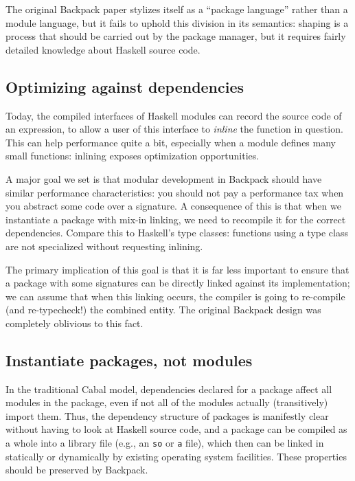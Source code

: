 The original Backpack paper stylizes itself as a ``package language''
rather than a module language, but it fails to uphold this division
in its semantics: shaping is a process that should be carried out
by the package manager, but it requires fairly detailed knowledge
about Haskell source code.

\subsection{Optimizing against dependencies}
\label{sec:optimizing}

Today, the compiled interfaces of Haskell modules can record the source
code of an expression, to allow a user of this interface to
\emph{inline} the function in question.  This can help performance quite
a bit, especially when a module defines many small functions: inlining
exposes optimization opportunities.

A major goal we set is that modular development in Backpack should have
similar performance characteristics: you should not pay a performance
tax when you abstract some code over a signature.  A consequence of this
is that when we instantiate a package with mix-in linking, we need to
recompile it for the correct dependencies.  Compare this to Haskell's
type classes: functions using a type class are not specialized without
requesting inlining.

The primary implication of this goal is that it is far less important to
ensure that a package with some signatures can be directly linked
against its implementation; we can assume that when this linking occurs,
the compiler is going to re-compile (and re-typecheck!) the combined
entity.  The original Backpack design was completely oblivious to this fact.

\subsection{Instantiate packages, not modules}
\label{sec:instantiate-pkgs}

In the traditional Cabal model, dependencies declared for a package
affect all modules in the package, even if not all of the modules
actually (transitively) import them.  Thus, the dependency structure of
packages is manifestly clear without having to look at Haskell source
code, and a package can be compiled as a whole into a library file
(e.g., an \verb|so| or \verb|a| file), which then can be linked in
statically or dynamically by existing operating system facilities.
These properties should be preserved by Backpack.

